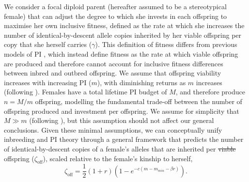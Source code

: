 \documentclass[12pt]{article}
\begin{document}
We consider a focal diploid parent (hereafter assumed to be a stereotypical female) that can adjust the degree to which she invests in each offspring to maximise her own inclusive fitness, defined as the rate at which she increases the number of identical-by-descent allele copies inherited by her viable offspring per copy that she herself carries ($\gamma$). This definition of fitness differs from previous models of PI \cite[][]{Macnair1978, Parker1978}, which instead define fitness as the rate at which viable offspring are produced and therefore cannot account for inclusive fitness differences between inbred and outbred offspring. We assume that offspring viability increases with increasing PI ($m$), with diminishing returns as $m$ increases (following \cite[][]{Parker1978}). Females have a total lifetime PI budget of $M$, and therefore produce $n=M/m$ offspring, modelling the fundamental trade-off between the number of offspring produced and investment per offspring. We assume for simplicity that $M \gg m$ (following \cite[][]{Parker1985}), but this assumption should not affect our general conclusions. Given these minimal assumptions, we can conceptually unify inbreeding and PI theory through a general framework that predicts the number of identical-by-descent copies of a female's alleles that are inherited per {\color{red}\st{viable}} offspring {\color{blue}($\zeta_{\textrm{off}}$), scaled relative to the female's kinship to herself},
\begin{equation} \label{maineq}
\zeta_{\textrm{off}} = \frac{1}{2}\left(1+r\right)\left(1-e^{-c\left(m-m_{min}-\beta r\right)}\right).
\end{equation}
\end{document}
